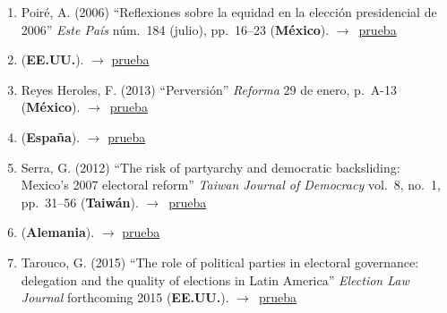 \documentclass[12 pt, letter]{article}
\newenvironment{CitasMiTrabajo}{
    \begin{footnotesize}
    \begin{enumerate}[label={\footnotesize\emph{cita~\arabic*}},ref=\arabic*] %
        \setlength{\itemsep}{.1\itemsep}
        \setlength{\parskip}{.1\parskip}
    }{\end{enumerate}\end{footnotesize}}
\begin{document}
\begin{CitasMiTrabajo}
        \item Poir\'e, A. (2006)
        ``Reflexiones sobre la equidad en la
        elecci\'on presidencial de 2006'' \emph{Este Pa\'is} n\'um.\ 184
        (julio), pp.\ 16--23  (\textbf{M\'exico}). $\rightarrow$~\href{https://github.com/emagar/cv/blob/master/citasMiTrab/estevezEtalElecStud/poire.pdf}{prueba}

        \item {} (\textbf{EE.UU.}).  $\rightarrow$ \href{https://github.com/emagar/cv/blob/master/citasMiTrab/estevezEtalElecStud/resendiz2014.pdf}{prueba}

        \item Reyes Heroles, F. (2013)
            ``Perversi\'on''
            \emph{Reforma}
            29 de enero, p.\ A-13 (\textbf{M\'exico}). $\rightarrow$~\href{https://github.com/emagar/cv/blob/master/citasMiTrab/estevezEtalElecStud/reyesHeroles2013.pdf}{prueba}

        \item {} (\textbf{Espa\~na}).  $\rightarrow$ \href{https://github.com/emagar/cv/blob/master/citasMiTrab/estevezEtalElecStud/martinTrife2012amlh.pdf}{prueba}

        \item Serra, G. (2012)
            ``The risk of partyarchy and democratic backsliding: Mexico's 2007 electoral reform''
            \emph{Taiwan Journal of Democracy}
            vol.\ 8, no.\ 1, pp.\ 31--56 (\textbf{Taiw\'an}). $\rightarrow$~\href{https://github.com/emagar/cv/blob/master/citasMiTrab/estevezEtalElecStud/serraElecRefMexico2012tjd.pdf}{prueba}

        \item {} (\textbf{Alemania}).  $\rightarrow$ \href{https://github.com/emagar/cv/blob/master/citasMiTrab/estevezEtalElecStud/serraDemiseResurrection2013jpla.pdf}{prueba}

       \item Tarouco, G. (2015)
            ``The role of political parties in electoral governance: delegation and the quality of elections in Latin America'' 
            \emph{Election Law Journal} forthcoming 2015  (\textbf{EE.UU.}). $\rightarrow$~\href{https://github.com/emagar/cv/blob/master/citasMiTrab/estevezEtalElecStud/taroucoRolePtiesEllGovernance2015elj.pdf}{prueba}


\end{CitasMiTrabajo}
\end{document}
